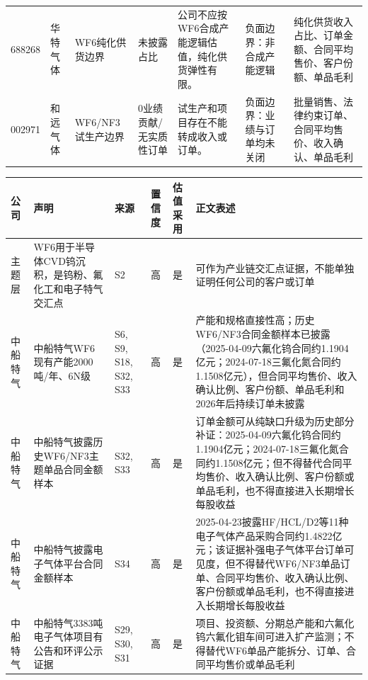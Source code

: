 \begin{exhibitbox}
\begin{tabularx}{\exhibitboxwidth}{L{0.85cm} L{1.15cm} L{1.45cm} X X X X}
688268 & 华特气体 & WF6纯化供货边界 & 未披露占比 & 公司不应按WF6合成产能逻辑估值，纯化供货弹性有限。 & 负面边界：非合成产能逻辑 & 纯化供货收入占比、订单金额、合同平均售价、客户份额、单品毛利 \\
002971 & 和远气体 & WF6/NF3试生产边界 & 0业绩贡献/无实质性订单 & 试生产和项目存在不能转成收入或订单。 & 负面边界：业绩与订单均未关闭 & 批量销售、法律约束订单、合同平均售价、收入确认、单品毛利 \\
\bottomrule
\end{tabularx}
\end{exhibitbox}

\begin{exhibitbox}[客户链高影响声明审计]
\footnotesize
\begin{tabularx}{\exhibitboxwidth}{L{1.3cm} X L{1.35cm} L{0.85cm} L{0.95cm} X}
\toprule
\textbf{公司} & \textbf{声明} & \textbf{来源} & \textbf{置信度} & \textbf{估值采用} & \textbf{正文表述} \\
\midrule
主题层 & WF6用于半导体CVD钨沉积，是钨粉、氟化工和电子特气交汇点 & S2 & 高 & 是 & 可作为产业链交汇点证据，不能单独证明任何公司的客户或订单 \\
中船特气 & 中船特气WF6现有产能2000吨/年、6N级 & S6, S9, S18, S32, S33 & 高 & 是 & 产能和规格直接性高；历史WF6/NF3合同金额样本已披露（2025-04-09六氟化钨合同约1.1904亿元；2024-07-18三氟化氮合同约1.1508亿元），但合同平均售价、收入确认比例、客户份额、单品毛利和2026年后持续订单未披露 \\
中船特气 & 中船特气披露历史WF6/NF3主题单品合同金额样本 & S32, S33 & 高 & 是 & 订单金额可从纯缺口升级为历史部分补证：2025-04-09六氟化钨合同约1.1904亿元；2024-07-18三氟化氮合同约1.1508亿元；但不得替代合同平均售价、收入确认比例、客户份额或单品毛利，也不得直接进入长期增长每股收益 \\
中船特气 & 中船特气披露电子气体平台合同金额样本 & S34 & 高 & 是 & 2025-04-23披露HF/HCL/D2等11种电子气体产品采购合同约1.4822亿元；该证据补强电子气体平台订单可见度，但不得替代WF6/NF3单品订单、合同平均售价、收入确认比例、客户份额或单品毛利，也不得直接进入长期增长每股收益 \\
中船特气 & 中船特气3383吨电子气体项目有公告和环评公示证据 & S29, S30, S31 & 高 & 是 & 项目、投资额、分期总产能和六氟化钨六氟化钼车间可进入扩产监测；不得替代WF6单品产能拆分、订单、合同平均售价或单品毛利 \\

\end{tabularx}
\end{exhibitbox}
